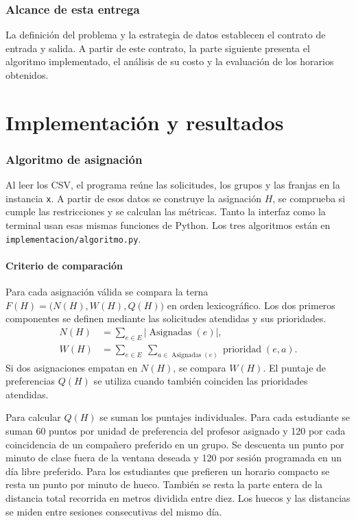 \documentclass[11pt]{article}
\numberwithin{equation}{section}
\numberwithin{figure}{section}
\numberwithin{table}{section}
\theoremstyle{definition}
\begin{document}
\section{Alcance de esta entrega}

La definición del problema y la estrategia de datos establecen el
contrato de entrada y salida. A partir de este contrato, la parte
siguiente presenta el algoritmo implementado, el análisis de su costo
y la evaluación de los horarios obtenidos.

\clearpage
\part{Implementación y resultados}

\section{Algoritmo de asignación}

Al leer los CSV, el programa reúne las solicitudes, los grupos y las
franjas en la instancia \texttt{x}. A partir de esos datos se construye
la asignación \(H\), se comprueba si cumple las restricciones y se
calculan las métricas. Tanto la interfaz como la terminal usan esas
mismas funciones de Python. Los tres algoritmos están en
\texttt{implementacion/algoritmo.py}.

\subsection{Criterio de comparación}
\label{sec:criterio-final}

Para cada asignación válida se compara la terna \(F(H)=\bigl(N(H),W(H),Q(H)\bigr)\)
en orden lexicográfico. Los dos primeros componentes se definen mediante
las solicitudes atendidas y sus prioridades.
\[
\begin{aligned}
N(H)&=\sum_{e\in E}\left|\operatorname{Asignadas}(e)\right|,\\
W(H)&=\sum_{e\in E}\ \sum_{a\in\operatorname{Asignadas}(e)}
        \operatorname{prioridad}(e,a).
\end{aligned}
\]
Si dos asignaciones empatan en \(N(H)\), se compara \(W(H)\).
El puntaje de preferencias \(Q(H)\) se utiliza cuando también
coinciden las prioridades atendidas.

Para calcular \(Q(H)\) se suman los puntajes individuales. Para cada
estudiante se suman 60 puntos por unidad de preferencia del profesor
asignado y 120 por cada coincidencia de un compañero preferido en un
grupo. Se descuenta un punto por minuto de clase fuera de la ventana
deseada y 120 por sesión programada en un día libre preferido. Para
los estudiantes que prefieren un horario compacto se resta un punto
por minuto de hueco. También se resta la parte entera de la distancia
total recorrida en metros dividida entre diez. Los huecos y las
distancias se miden entre sesiones consecutivas del mismo día.
\end{document}
